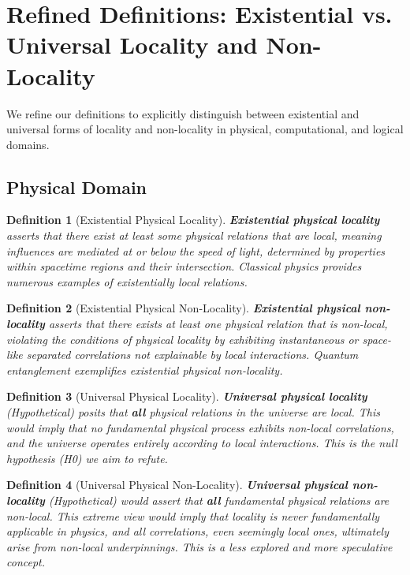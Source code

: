 \documentclass{article}
\newtheorem{definition}{Definition}
\begin{document}
	\section{Refined Definitions: Existential vs. Universal Locality and Non-Locality}

	We refine our definitions to explicitly distinguish between existential and universal forms of locality and non-locality in physical, computational, and logical domains.

	\subsection{Physical Domain}

	\begin{definition}[Existential Physical Locality]
		\textbf{Existential physical locality} asserts that there exist at least some physical relations that are local, meaning influences are mediated at or below the speed of light, determined by properties within spacetime regions and their intersection.  Classical physics provides numerous examples of existentially local relations.
	\end{definition}

	\begin{definition}[Existential Physical Non-Locality]
		\textbf{Existential physical non-locality} asserts that there exists at least one physical relation that is non-local, violating the conditions of physical locality by exhibiting instantaneous or space-like separated correlations not explainable by local interactions. Quantum entanglement exemplifies existential physical non-locality.
	\end{definition}

	\begin{definition}[Universal Physical Locality]
		\textbf{Universal physical locality} (Hypothetical) posits that \textbf{all} physical relations in the universe are local. This would imply that no fundamental physical process exhibits non-local correlations, and the universe operates entirely according to local interactions. This is the null hypothesis (H0) we aim to refute.
	\end{definition}

	\begin{definition}[Universal Physical Non-Locality]
		\textbf{Universal physical non-locality} (Hypothetical) would assert that \textbf{all} fundamental physical relations are non-local. This extreme view would imply that locality is never fundamentally applicable in physics, and all correlations, even seemingly local ones, ultimately arise from non-local underpinnings.  This is a less explored and more speculative concept.
	\end{definition}
\end{document}
